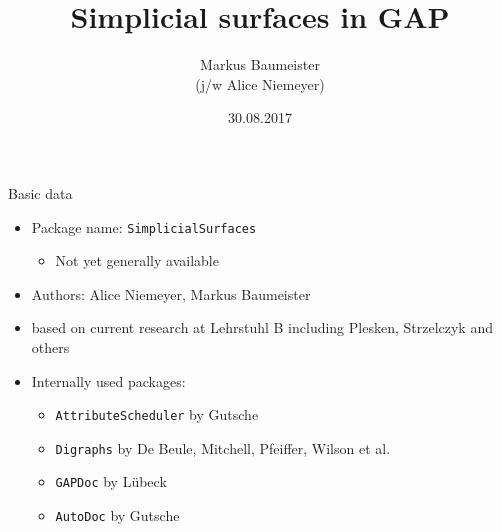 \documentclass[11pt, handout]{beamer}
\author[Baumeister]{Markus Baumeister\\ \vspace{1mm} \small{(j/w Alice Niemeyer)}}
\title{Simplicial surfaces in GAP}
\institute[Aachen]{Lehrstuhl B für Mathematik\\RWTH Aachen University}
\date{30.08.2017}
\begin{document}
\begin{frame}
\titlepage
\end{frame}

\begin{frame}{Basic data}
    \begin{itemize}
        \pause
        \item Package name: \texttt{SimplicialSurfaces}
            \begin{itemize}
                \pause
                \item Not yet generally available
            \end{itemize}
        \pause
        \item Authors: Alice Niemeyer, Markus Baumeister
        \pause
        \item based on current research at Lehrstuhl B including Plesken, Strzelczyk and others
        \pause
        \item Internally used packages:
            \begin{itemize}
                \pause
                \item \texttt{AttributeScheduler} by Gutsche
                \pause
                \item \texttt{Digraphs} by De Beule, Mitchell, Pfeiffer, Wilson et al.
                \pause
                \item \texttt{GAPDoc} by Lübeck
                \pause
                \item \texttt{AutoDoc} by Gutsche
            \end{itemize}
    \end{itemize}
\end{frame}
\end{document}
